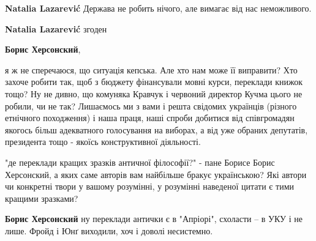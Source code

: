 \begin{itemize}
\begin{itemize}
\textbf{Natalia Lazarević} Держава не робить нічого, але вимагає від нас неможливого.

 
\textbf{Natalia Lazarević} згоден

 
\textbf{Борис Херсонский}, 

я ж не сперечаюся, що ситуація кепська. Але хто нам може її виправити? Хто
захоче робити так, щоб з бюджету фінансували мовні курси, переклади книжок
тощо? Ну не дивно, що комуняка Кравчук і червоний директор Кучма цього не
робили, чи не так? Лишаємось ми з вами і решта свідомих українців (різного
етнічного походження) і наша праця, наші спроби добитися від співгромадян
якогось більш адекватного голосування на виборах, а від уже обраних депутатів,
президента тощо - якоїсь конструктивної діяльності.


 

"де переклади кращих зразків античної філософії?" - пане Борисе Борис
Херсонский, а яких саме авторів вам найбільше бракує українською? Які автори чи
конкретні твори у вашому розумінні, у розумінні наведеної цитати є тими кращими
зразками?

 

\textbf{Борис Херсонский} ну переклади антички є в "Апріорі", схоласти – в УКУ і не лише.
Фройд і Юнґ виходили, хоч і доволі несистемно.

 

\end{itemize}
\end{itemize}
